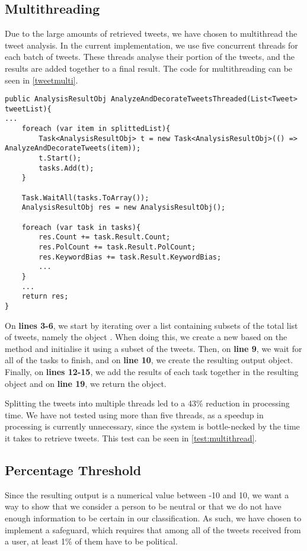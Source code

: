 \subsection{Multithreading}
Due to the large amounts of retrieved tweets, we have chosen to multithread the
tweet analysis. In the current implementation, we use five concurrent threads
for each batch of tweets. These threads analyse their portion of the tweets, and the
results are added together to a final result. The code for multithreading can be
seen in \autoref{tweetmulti}.\nl

\begin{minipage}[H]{\linewidth}
\begin{lstlisting}[caption = Multithreading of the tweet analysis., label =
tweetmulti] 
public AnalysisResultObj AnalyzeAndDecorateTweetsThreaded(List<Tweet> tweetList){ 
...
	foreach (var item in splittedList){
    	Task<AnalysisResultObj> t = new Task<AnalysisResultObj>(() => AnalyzeAndDecorateTweets(item)); 
    	t.Start();
        tasks.Add(t);
    }

	Task.WaitAll(tasks.ToArray());
    AnalysisResultObj res = new AnalysisResultObj();
 
    foreach (var task in tasks){
    	res.Count += task.Result.Count;
        res.PolCount += task.Result.PolCount;
        res.KeywordBias += task.Result.KeywordBias;
		...
    }
    ...
    return res;
}
\end{lstlisting}
\end{minipage}

On \textbf{lines 3-6}, we start by iterating over a list containing
subsets of the total list of tweets, namely the object . When doing this, we
create a new  based on the  method
and initialise it using a subset of the tweets. Then, on \textbf{line 9}, we wait
for all of the tasks to finish, and on \textbf{line 10}, we create the resulting
output object. Finally, on \textbf{lines 12-15}, we add the results of each task
together in the resulting object and on \textbf{line 19}, we return the
object.\nl

Splitting the tweets into multiple threads led to a 43\% reduction in processing
time. We have not tested using more than five threads, as a speedup in
processing is currently unnecessary, since the system is bottle-necked by the
time it takes to retrieve tweets. This test can be seen in
\autoref{test:multithread}.\nl

\subsection{Percentage Threshold}
Since the resulting output is a numerical value between -10 and 10, we want a
way to show that we consider a person to be neutral or that we do not have
enough information to be certain in our classification. As such, we have chosen
to implement a safeguard, which requires that among all of the tweets received
from a user, at least 1\% of them have to be political. 